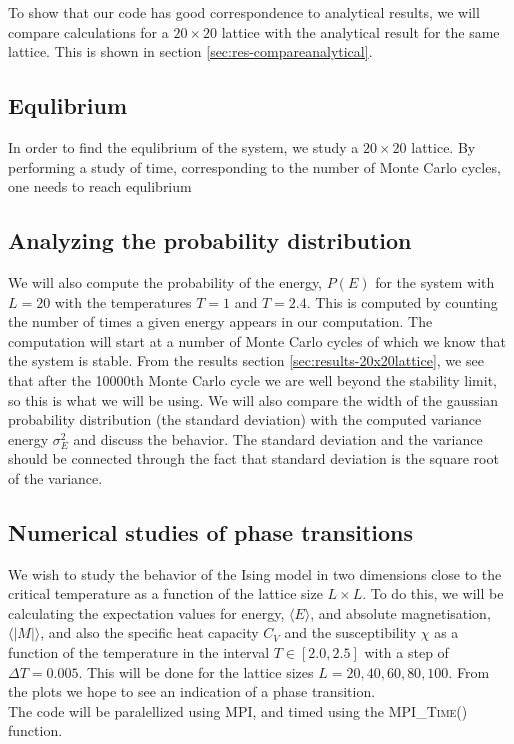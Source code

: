 \documentclass[../main.tex]{subfiles}
\begin{document}


To show that our code has good correspondence to analytical results, we will compare calculations for a $20\times 20$ lattice with the analytical result for the same lattice. This is shown in section \ref{sec:res-compareanalytical}.

\subsection{Equlibrium}
In order to find the equlibrium of the system, we study a $20\times 20$ lattice. By performing a study of time, corresponding to the number of Monte Carlo cycles, one needs to reach equlibrium
\subsection{Analyzing the probability distribution}
We will also compute the probability of the energy, $P(E)$ for the system with $L = 20$ with the temperatures $T= 1$ and $T= 2.4$. This is computed by counting the number of times a given energy appears in our computation. The computation will start at a number of Monte Carlo cycles of which we know that the system is stable. From the results section \ref{sec:results-20x20lattice}, we see that after the 10000th Monte Carlo cycle we are well beyond the stability limit, so this is what we will be using. We will also compare the width of the gaussian probability distribution (the standard deviation) with the computed variance energy $\sigma_E^2$ and discuss the behavior. The standard deviation and the variance should be connected through the fact that standard deviation is the square root of the variance.


\subsection{Numerical studies of phase transitions}
We wish to study the behavior of the Ising model in two dimensions close to the critical temperature as a function of the lattice size $L \times L$.  To do this, we will be calculating the expectation values for energy, $\langle E \rangle$, and absolute magnetisation, $\langle |M| \rangle$, and also the specific heat capacity $C_V$ and the susceptibility $\chi$ as a function of the temperature in the interval $ T \in [2.0,2.5]$ with a step of $\Delta T = 0.005$. This will be done for the lattice sizes $L = {20, 40, 60, 80, 100}$. From the plots we hope to see an indication of a phase transition.\\
The code will be paralellized using MPI, and timed using the \textsc{MPI\_Time()} function.
\end{document}
